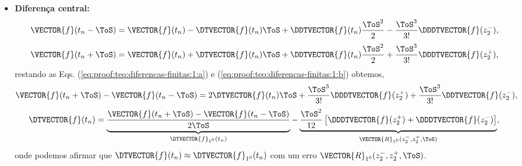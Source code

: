 \begin{myproofT}
\begin{itemize}
\item \textbf{Diferença central:} 
\begin{equation}\label{eq:proof:teo:diferencas-finitas:1:a}
\VECTOR{f}(t_n-\ToS) = \VECTOR{f}(t_n)-\DTVECTOR{f}(t_n)\ToS +\DDTVECTOR{f}(t_n) \frac{\ToS^2}{2}-\frac{\ToS^3}{3!}\DDDTVECTOR{f}(z_{2}^{-}),
\end{equation}
\begin{equation}\label{eq:proof:teo:diferencas-finitas:1:b}
\VECTOR{f}(t_n+\ToS) = \VECTOR{f}(t_n)+\DTVECTOR{f}(t_n)\ToS +\DDTVECTOR{f}(t_n) \frac{\ToS^2}{2}+\frac{\ToS^3}{3!}\DDDTVECTOR{f}(z_{2}^{+}),
\end{equation}
restando as Eqs. (\ref{eq:proof:teo:diferencas-finitas:1:a}) e (\ref{eq:proof:teo:diferencas-finitas:1:b}) obtemos,
\begin{equation}
\VECTOR{f}(t_n+\ToS) - \VECTOR{f}(t_n-\ToS) = 2\DTVECTOR{f}(t_n)\ToS +\frac{\ToS^3}{3!}\DDDTVECTOR{f}(z_{2}^{+}) + \frac{\ToS^3}{3!}\DDTVECTOR{f}(z_{2}^{-}),
\end{equation}
\begin{equation}
\DTVECTOR{f}(t_n) = \underbrace{\frac{\VECTOR{f}(t_n+\ToS) - \VECTOR{f}(t_n-\ToS)}{2\ToS}}_{\DTVECTOR{f}_{1^{0}}(t_n)} - 
\underbrace{\frac{\ToS^2}{12} \left[\DDDTVECTOR{f}(z_{2}^{+}) + \DDDTVECTOR{f}(z_{2}^{-})\right]}_{\VECTOR{R}_{1^{0}}(z_{2}^{-},z_{2}^{+},\ToS)},
\end{equation}
onde podemos afirmar que $\DTVECTOR{f}(t_n)\approx \DTVECTOR{f}_{1^{0}}(t_n)$ 
com um erro $\VECTOR{R}_{1^{0}}(z_{2}^{-},z_{2}^{+},\ToS)$.
\end{itemize}
\end{myproofT}
